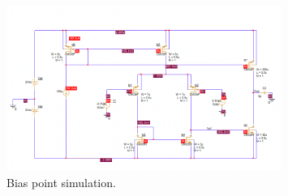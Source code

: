 \documentclass{article}
\newcommand \imgWidthFactor{0.8}
\begin{document}
		\begin{figure}[H]
			\centering
			\includegraphics[width=\imgWidthFactor\textwidth]{sch}
			\caption{Bias point simulation.}
		\end{figure}
\end{document}
